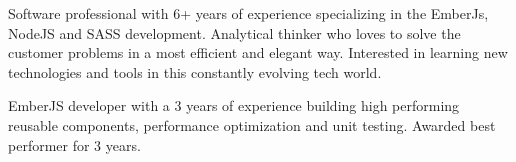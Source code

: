 

\begin{cvparagraph}

Software professional with 6+ years of experience specializing in the EmberJs, NodeJS and SASS development. Analytical thinker who loves to solve the customer problems in a most efficient and elegant way. Interested in learning new technologies and tools in this constantly evolving tech world.

\end{cvparagraph}

\begin{cvparagraph}

EmberJS developer with a 3 years of experience building high performing reusable components, performance optimization and unit testing. Awarded best performer for 3 years.

\end{cvparagraph}
